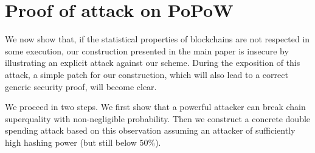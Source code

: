 \section{Proof of attack on PoPoW}
\label{sec:attack-full}

We now show that, if the statistical properties of blockchains are not respected
in some execution, our construction presented in the main paper is insecure by
illustrating an explicit attack against our scheme.
During the
exposition of this attack, a simple patch for our construction, which will also
lead to a correct generic security proof, will become clear.

We proceed in two steps. We
first show that a powerful attacker can break chain superquality with
non-negligible probability. Then we construct a concrete double spending attack
based on this observation assuming an attacker of sufficiently high hashing
power (but still below $50\%$).


